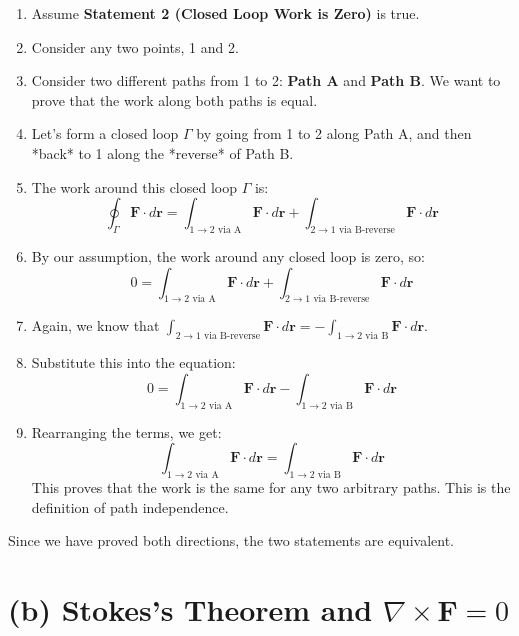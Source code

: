 \documentclass[11pt, a4paper]{article} %
\begin{document}
\begin{enumerate}
    \item Assume \textbf{Statement 2 (Closed Loop Work is Zero)} is true.
    \item Consider any two points, 1 and 2.
    \item Consider two different paths from 1 to 2: \textbf{Path A} and \textbf{Path B}. We want to prove that the work along both paths is equal.
    \item Let's form a closed loop $\Gamma$ by going from 1 to 2 along Path A, and then *back* to 1 along the *reverse* of Path B.
    \item The work around this closed loop $\Gamma$ is:
    $$\oint_\Gamma \mathbf{F} \cdot d \mathbf{r} = \int_{1 \to 2 \text{ via A}} \mathbf{F} \cdot d \mathbf{r} + \int_{2 \to 1 \text{ via B-reverse}} \mathbf{F} \cdot d \mathbf{r}$$
    \item By our assumption, the work around any closed loop is zero, so:
    $$0 = \int_{1 \to 2 \text{ via A}} \mathbf{F} \cdot d \mathbf{r} + \int_{2 \to 1 \text{ via B-reverse}} \mathbf{F} \cdot d \mathbf{r}$$
    \item Again, we know that $\int_{2 \to 1 \text{ via B-reverse}} \mathbf{F} \cdot d \mathbf{r} = - \int_{1 \to 2 \text{ via B}} \mathbf{F} \cdot d \mathbf{r}$.
    \item Substitute this into the equation:
    $$0 = \int_{1 \to 2 \text{ via A}} \mathbf{F} \cdot d \mathbf{r} - \int_{1 \to 2 \text{ via B}} \mathbf{F} \cdot d \mathbf{r}$$
    \item Rearranging the terms, we get:
    $$\int_{1 \to 2 \text{ via A}} \mathbf{F} \cdot d \mathbf{r} = \int_{1 \to 2 \text{ via B}} \mathbf{F} \cdot d \mathbf{r}$$
    This proves that the work is the same for any two arbitrary paths. This is the definition of path independence.
\end{enumerate}

Since we have proved both directions, the two statements are equivalent.

\hrulefill

\section*{(b) Stokes's Theorem and $\nabla \times \mathbf{F} = 0$}
\end{document}
